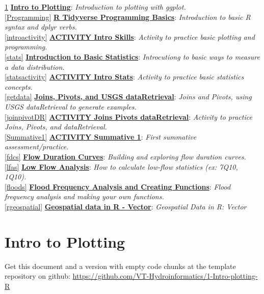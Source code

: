 \documentclass[
]{book}
\begin{document}
\ref{Plotting} \textbf{\protect\hyperlink{Plotting}{Intro to Plotting}}: \emph{Introduction to plotting with ggplot.}\\
\ref{Programming} \textbf{\protect\hyperlink{Programming}{R Tidyverse Programming Basics}}: \emph{Introduction to basic R syntax and dplyr verbs.}\\
\ref{introactivity} \textbf{\protect\hyperlink{introactivity}{ACTIVITY Intro Skills}}: \emph{Activity to practice basic plotting and programming.}\\
\ref{stats} \textbf{\protect\hyperlink{stats}{Introduction to Basic Statistics}}: \emph{Introcutiong to basic ways to measure a data distribution.}\\
\ref{statsactivity} \textbf{\protect\hyperlink{statsactivity}{ACTIVITY Intro Stats}}: \emph{Activity to practice basic statistics concepts.}\\
\ref{getdata} \textbf{\protect\hyperlink{getdata}{Joins, Pivots, and USGS dataRetrieval}}: \emph{Joins and Pivots, using USGS dataRetrieval to generate examples.}\\
\ref{joinpivotDR} \textbf{\protect\hyperlink{joinpivotDR}{ACTIVITY Joins Pivots dataRetrieval}}: \emph{Activity to practice Joins, Pivots, and dataRetrieval.}\\
\ref{Summative1} \textbf{\protect\hyperlink{Summative1}{ACTIVITY Summative 1}}: \emph{First summative assessment/practice.}\\
\ref{fdcs} \textbf{\protect\hyperlink{fdcs}{Flow Duration Curves}}: \emph{Building and exploring flow duration curves.}\\
\ref{lfas} \textbf{\protect\hyperlink{lfas}{Low Flow Analysis}}: \emph{How to calculate low-flow statistics (ex: 7Q10, 1Q10).}\\
\ref{floods} \textbf{\protect\hyperlink{floods}{Flood Frequency Analysis and Creating Functions}}: \emph{Flood frequency analysis and making your own functions.}\\
\ref{rgeospatial} \textbf{\protect\hyperlink{rgeospatial}{Geospatial data in R - Vector}}: \emph{Geospatial Data in R: Vector}

\hypertarget{Plotting}{%
\chapter{Intro to Plotting}\label{Plotting}}

Get this document and a version with empty code chunks at the template repository on github: \url{https://github.com/VT-Hydroinformatics/1-Intro-plotting-R}
\end{document}
